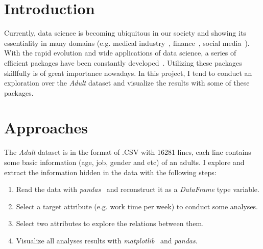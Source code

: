 \documentclass[12pt,a4paper]{article}
\theoremstyle{definition}
\begin{document}
\noindent
\noindent{}
\vspace{-1.5\baselineskip}

\renewcommand{\figurename}{Figure}
\section{Introduction} %

Currently, data science is becoming ubiquitous in our society and showing its essentiality in many domains (e.g. medical industry~\cite{medical1, medical2}, finance~\cite{finance}, social media~\cite{media1, media2}). With the rapid evolution and wide applications of data science, a series of efficient packages have been constantly developed~\cite{numpy, pandas, matplotlib, sklearn}. Utilizing these packages skillfully is of great importance nowadays. In this project, I tend to conduct an exploration over the \textit{Adult} dataset and visualize the results with some of these packages.

\vspace{-1\baselineskip}
\section{Approaches}

The \textit{Adult} dataset is in the format of .CSV with 16281 lines, each line contains some basic information (age, job, gender and etc) of an adults. I explore and extract the information hidden in the data with the following steps:

\begin{enumerate}
\item Read the data with \textit{pandas}~\cite{pandas} and reconstruct it as a \textit{DataFrame} type variable.

\item Select a target attribute (e.g. work time per week) to conduct some analyses.

\item Select two attributes to explore the relations between them.

\item Visualize all analyses results with \textit{matplotlib}~\cite{matplotlib} and \textit{pandas}.
\end{enumerate}
\end{document}
